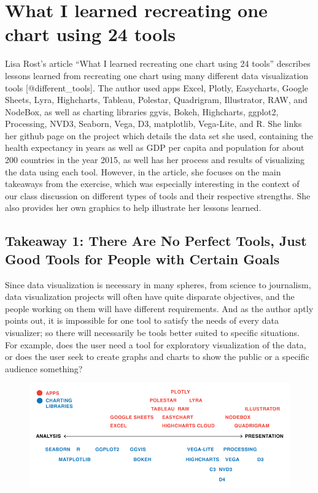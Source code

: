 \documentclass[]{book}
\theoremstyle{definition}
\theoremstyle{definition}
\theoremstyle{definition}
\theoremstyle{remark}
\begin{document}
\section{What I learned recreating one chart using 24
tools}\label{what-i-learned-recreating-one-chart-using-24-tools}

Lisa Rost's article ``What I learned recreating one chart using 24
tools'' describes lessons learned from recreating one chart using many
different data visualization tools {[}@different\_tools{]}. The author
used apps Excel, Plotly, Easycharts, Google Sheets, Lyra, Highcharts,
Tableau, Polestar, Quadrigram, Illustrator, RAW, and NodeBox, as well as
charting libraries ggvis, Bokeh, Highcharts, ggplot2, Processing, NVD3,
Seaborn, Vega, D3, matplotlib, Vega-Lite, and R. She links her github
page on the project which details the data set she used, containing the
health expectancy in years as well as GDP per capita and population for
about 200 countries in the year 2015, as well has her process and
results of visualizing the data using each tool. However, in the
article, she focuses on the main takeaways from the exercise, which was
especially interesting in the context of our class discussion on
different types of tools and their respective strengths. She also
provides her own graphics to help illustrate her lessons learned.

\subsection{Takeaway 1: There Are No Perfect Tools, Just Good Tools for
People with Certain
Goals}\label{takeaway-1-there-are-no-perfect-tools-just-good-tools-for-people-with-certain-goals}

Since data visualization is necessary in many spheres, from science to
journalism, data visualization projects will often have quite disparate
objectives, and the people working on them will have different
requirements. And as the author aptly points out, it is impossible for
one tool to satisfy the needs of every data visualizer; so there will
necessarily be tools better suited to specific situations. For example,
does the user need a tool for exploratory visualization of the data, or
does the user seek to create graphs and charts to show the public or a
specific audience something?

\begin{figure}
\centering
\includegraphics{images/analysis_spectrum.png}
\caption{}
\end{figure}
\end{document}
